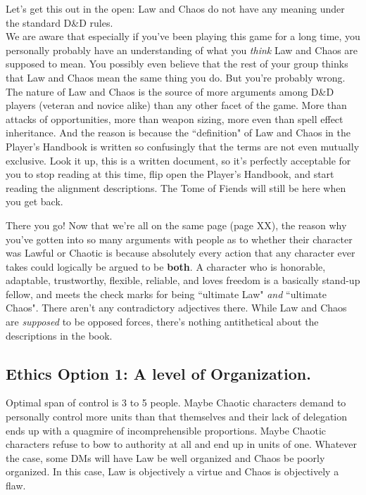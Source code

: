 Let's get this out in the open: Law and Chaos do not have any meaning under the standard D\&D rules.\\

We are aware that especially if you've been playing this game for a long time, you personally probably have an understanding of what you \textit{think} Law and Chaos are supposed to mean. You possibly even believe that the rest of your group thinks that Law and Chaos mean the same thing you do. But you're probably wrong. The nature of Law and Chaos is the source of more arguments among D\&D players (veteran and novice alike) than any other facet of the game. More than attacks of opportunities, more than weapon sizing, more even than spell effect inheritance. And the reason is because the ``definition" of Law and Chaos in the Player's Handbook is written so confusingly that the terms are not even mutually exclusive. Look it up, this is a written document, so it's perfectly acceptable for you to stop reading at this time, flip open the Player's Handbook, and start reading the alignment descriptions. The Tome of Fiends will still be here when you get back.

There you go! Now that we're all on the same page (page XX), the reason why you've gotten into so many arguments with people as to whether their character was Lawful or Chaotic is because absolutely every action that any character ever takes could logically be argued to be \textbf{both}. A character who is honorable, adaptable, trustworthy, flexible, reliable, and loves freedom is a basically stand-up fellow, and meets the check marks for being ``ultimate Law" \textit{and} ``ultimate Chaos". There aren't any contradictory adjectives there. While Law and Chaos are \textit{supposed} to be opposed forces, there's nothing antithetical about the descriptions in the book.


\subsection{Ethics Option 1: A level of Organization.}
Optimal span of control is 3 to 5 people. Maybe Chaotic characters demand to personally control more units than that themselves and their lack of delegation ends up with a quagmire of incomprehensible proportions. Maybe Chaotic characters refuse to bow to authority at all and end up in units of one. Whatever the case, some DMs will have Law be well organized and Chaos be poorly organized. In this case, Law is objectively a virtue and Chaos is objectively a flaw.

